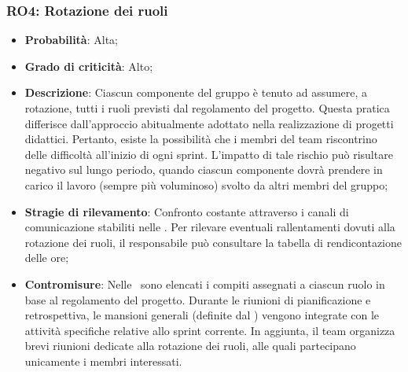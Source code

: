 \subsubsection{RO4: Rotazione dei ruoli}
\begin{itemize}
    \item \textbf{Probabilità}: Alta;
    \item \textbf{Grado di criticità}: Alto;
    \item \textbf{Descrizione}: Ciascun componente del gruppo è tenuto ad assumere, a rotazione, tutti i ruoli previsti dal regolamento del progetto. Questa pratica differisce dall'approccio abitualmente adottato nella realizzazione di progetti didattici. Pertanto, esiste la possibilità che i membri del team riscontrino delle difficoltà all’inizio di ogni sprint. L’impatto di tale rischio può risultare negativo sul lungo periodo, quando ciascun componente dovrà prendere in carico il lavoro (sempre più voluminoso) svolto da altri membri del gruppo;
    \item \textbf{Stragie di rilevamento}: Confronto costante attraverso i canali di comunicazione stabiliti nelle \NdP. Per rilevare eventuali rallentamenti dovuti alla rotazione dei ruoli, il responsabile può consultare la tabella di rendicontazione delle ore;
    \item \textbf{Contromisure}: Nelle \NdP\ sono elencati i compiti assegnati a ciascun ruolo in base al regolamento del progetto. Durante le riunioni di pianificazione e retrospettiva, le mansioni generali (definite dal \WoW) vengono integrate con le attività specifiche relative allo sprint corrente. In aggiunta, il team organizza brevi riunioni dedicate alla rotazione dei ruoli, alle quali partecipano unicamente i membri interessati.
\end{itemize}
